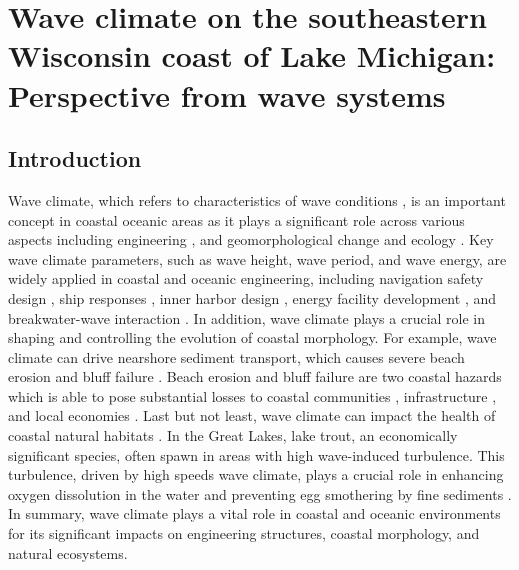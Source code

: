 \chapter{Wave climate on the southeastern Wisconsin coast of Lake Michigan: Perspective from wave systems}
\label{chapter4}

\section{Introduction}
\label{c4_Introduction}

Wave climate, which refers to characteristics of wave conditions
\citep{wiegel_oceanographical_2013}, is an important concept in coastal oceanic
areas as it plays a significant role across various aspects including
engineering \citep{manual1995design,goda2010random}, and geomorphological change
\citep{ashton2006high1,ashton2006high2,hapke2010predicting} and ecology
\citep{zhu2022wave,denny2021wave}. Key wave climate parameters, such as wave
height, wave period, and wave energy, are widely applied in coastal and oceanic
engineering, including navigation safety design
\citep{lee_boundary_2009,phelps_ship_1995}, ship responses
\citep{phelps_ship_1995}, inner harbor design
\citep{romano-moreno_multimodal_2023}, energy facility development
\citep{lee_boundary_2009,liu_wind_2017} , and breakwater-wave interaction
\citep{jiang_wave_2017,lee_comparison_2006}. In addition, wave climate plays a
crucial role in shaping and controlling the evolution of coastal morphology. For
example, wave climate can drive nearshore sediment transport, which causes
severe beach erosion and bluff failure
\citep{benumof_relationship_2000,brown_factors_2005,lamoe_wave_1989}. Beach
erosion and bluff failure are two coastal hazards which is able to pose
substantial losses to coastal communities \citep{buck2025living}, infrastructure
\citep{adshead2024climate,steven2023coastal}, and local economies
\citep{nopiana2024estimating,gopalakrishnan2016economics,landry2011coastal}.
Last but not least, wave climate can impact the health of coastal natural
habitats \citep{meadows_cumulative_2005}. In the Great Lakes, lake trout, an
economically significant species, often spawn in areas with high wave-induced
turbulence.  This turbulence, driven by high speeds wave climate, plays a
crucial role in enhancing oxygen dissolution in the water and preventing egg
smothering by fine sediments
\citep{fitzsimons_relationship_2014,sly_interstitial_1988}. In summary, wave
climate plays a vital role in coastal and oceanic environments for its
significant impacts on engineering structures, coastal morphology, and natural
ecosystems.

